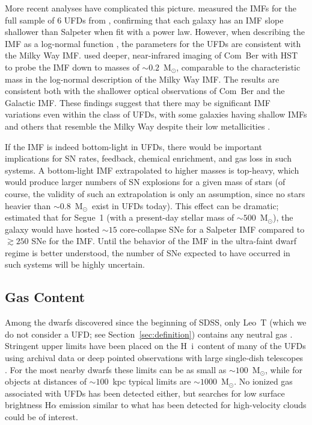 \documentclass[a4paper]{ar-1col}
\newcommand{\msun}        {M$_{\odot}$}
\newcommand{\hi}          {H~{\sc i}}
\begin{document}
More recent analyses have complicated this picture.
\citet{gennaro18a} measured the IMFs for the full sample of 6 UFDs
from \citet{brown14}, confirming that each galaxy has an IMF slope
shallower than Salpeter when fit with a power law.  However, when
describing the IMF as a log-normal function \citep{chabrier03}, the
parameters for the UFDs are consistent with the Milky Way IMF.
\citet{gennaro18b} used deeper, near-infrared imaging of Com~Ber with
HST to probe the IMF down to masses of $\sim0.2$~\msun, comparable to
the characteristic mass in the log-normal description of the Milky Way
IMF.  The results are consistent both with the shallower optical
observations of Com~Ber and the \citet{chabrier03} Galactic IMF.
These findings suggest that there may be significant IMF variations
even within the class of UFDs, with some galaxies having shallow IMFs
and others that resemble the Milky Way despite their low metallicities
\citep{gennaro18b}.

If the IMF is indeed bottom-light in UFDs, there would be important
implications for SN rates, feedback, chemical enrichment, and gas loss
in such systems.  A bottom-light IMF extrapolated to higher masses is
top-heavy, which would produce larger numbers of SN explosions for a
given mass of stars (of course, the validity of such an extrapolation
is only an assumption, since no stars heavier than
$\sim0.8$~\msun\ exist in UFDs today).  This effect can be dramatic;
\citet{fsk14} estimated that for Segue~1 (with a present-day stellar
mass of $\sim500$~\msun), the galaxy would have hosted $\sim15$
core-collapse SNe for a Salpeter IMF compared to $\gtrsim250$ SNe for
the \citet{geha13} IMF.  Until the behavior of the IMF in the
ultra-faint dwarf regime is better understood, the number of SNe
expected to have occurred in such systems will be highly uncertain.


\subsection{Gas Content}

Among the dwarfs discovered since the beginning of SDSS, only Leo~T
(which we do not consider a UFD; see Section~\ref{sec:definition})
contains any neutral gas \citep{irwin07,rw08}.  Stringent upper limits
have been placed on the \hi\ content of many of the UFDs using
archival data or deep pointed observations with large single-dish
telescopes \citep{gp09,spekkens14,westmeier15}.  For the most nearby
dwarfs these limits can be as small as $\sim100$~\msun, while for
objects at distances of $\sim100$~kpc typical limits are
$\sim1000$~\msun.  No ionized gas associated with UFDs has been
detected either, but searches for low surface brightness H$\alpha$
emission similar to what has been detected for high-velocity clouds
\citep[e.g.,][]{putman03,barger12} could be of interest.
\end{document}
